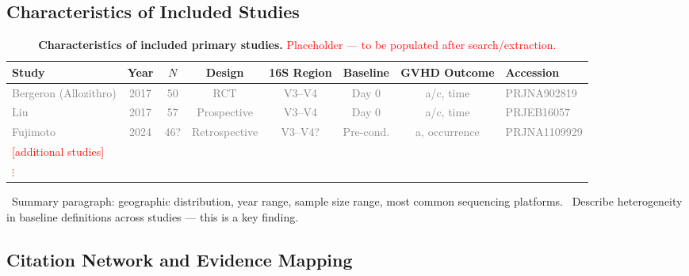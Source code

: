 \documentclass[11pt,a4paper]{article}
\newcommand{\todoitem}[1]{\textcolor{blue!70!black}{\textbullet~#1}}
\begin{document}
\subsection{Characteristics of Included Studies}
\label{sec:characteristics}

\begin{table}[htbp]
\centering
\caption{\textbf{Characteristics of included primary studies.} \textcolor{red}{Placeholder --- to be populated after search/extraction.}}
\label{tab:characteristics}
\small
\begin{tabular}{@{}lccccccl@{}}
\toprule
Study & Year & $N$ & Design & 16S Region & Baseline & GVHD Outcome & Accession \\
\midrule
\textcolor{gray}{Bergeron (Allozithro)} & \textcolor{gray}{2017} & \textcolor{gray}{50} & \textcolor{gray}{RCT} & \textcolor{gray}{V3--V4} & \textcolor{gray}{Day 0} & \textcolor{gray}{a/c, time} & \textcolor{gray}{PRJNA902819} \\
\textcolor{gray}{Liu} & \textcolor{gray}{2017} & \textcolor{gray}{57} & \textcolor{gray}{Prospective} & \textcolor{gray}{V3--V4} & \textcolor{gray}{Day 0} & \textcolor{gray}{a/c, time} & \textcolor{gray}{PRJEB16057} \\
\textcolor{gray}{Fujimoto} & \textcolor{gray}{2024} & \textcolor{gray}{46?} & \textcolor{gray}{Retrospective} & \textcolor{gray}{V3--V4?} & \textcolor{gray}{Pre-cond.} & \textcolor{gray}{a, occurrence} & \textcolor{gray}{PRJNA1109929} \\
\textcolor{red}{[additional studies]} & & & & & & & \\
\textcolor{red}{$\vdots$} & & & & & & & \\
\bottomrule
\end{tabular}
\end{table}

\todoitem{Summary paragraph: geographic distribution, year range, sample size range, most common sequencing platforms.}
\todoitem{Describe heterogeneity in baseline definitions across studies --- this is a key finding.}


\subsection{Citation Network and Evidence Mapping}
\label{sec:citation_results}
\end{document}
